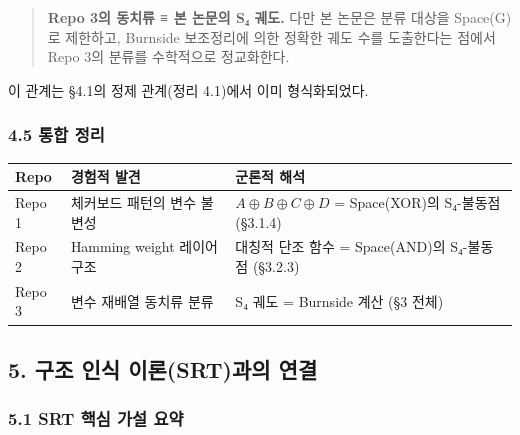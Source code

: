 \documentclass[
]{article}
\newcounter{none} %
\begin{document}
\begin{quote}
\textbf{Repo 3의 동치류 ≡ 본 논문의 S₄ 궤도.} 다만 본 논문은 분류 대상을
Space(G)로 제한하고, Burnside 보조정리에 의한 정확한 궤도 수를
도출한다는 점에서 Repo 3의 분류를 수학적으로 정교화한다.
\end{quote}

이 관계는 §4.1의 정제 관계(정리 4.1)에서 이미 형식화되었다.

\subsubsection{4.5 통합 정리}\label{uxd1b5uxd569-uxc815uxb9ac}

{\def\LTcaptype{none} %
\begin{longtable}[]{@{}
  >{\raggedright\arraybackslash}p{}
  >{\raggedright\arraybackslash}p{}
  >{\raggedright\arraybackslash}p{}@{}}
\toprule\noalign{}
\begin{minipage}[b]{\linewidth}\raggedright
Repo
\end{minipage} & \begin{minipage}[b]{\linewidth}\raggedright
경험적 발견
\end{minipage} & \begin{minipage}[b]{\linewidth}\raggedright
군론적 해석
\end{minipage} \\
\midrule\noalign{}
\endhead
\bottomrule\noalign{}
\endlastfoot
Repo 1 & 체커보드 패턴의 변수 불변성 & \(A \oplus B \oplus C \oplus D\)
= Space(XOR)의 S₄-불동점 (§3.1.4) \\
Repo 2 & Hamming weight 레이어 구조 & 대칭적 단조 함수 = Space(AND)의
S₄-불동점 (§3.2.3) \\
Repo 3 & 변수 재배열 동치류 분류 & S₄ 궤도 = Burnside 계산 (§3 전체) \\
\end{longtable}
}

\subsection{5. 구조 인식 이론(SRT)과의
연결}\label{uxad6cuxc870-uxc778uxc2dd-uxc774uxb860srtuxacfcuxc758-uxc5f0uxacb0}

\subsubsection{5.1 SRT 핵심 가설
요약}\label{srt-uxd575uxc2ec-uxac00uxc124-uxc694uxc57d}
\end{document}
